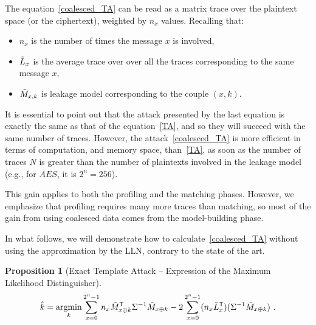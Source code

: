\documentclass[conference,twocolumn]{IEEEtran}
\newtheorem{proposition}{Proposition}
\DeclareMathOperator*\argmin{argmin}
\begin{document}
The equation~\eqref{coalesced_TA} can be read as a matrix trace over the plaintext space (or the ciphertext), weighted by $n_x$ values. 
Recalling that:
\begin{itemize}
\item $n_x$ is the number of times the message $x$ is involved,
\item $\Tilde{L}_x$ is the average trace over over all the traces corresponding to the same message $x$,
\item $\Tilde{M}_{x,k}$ is leakage model corresponding to the couple $(x,k)$. 
\end{itemize}
It is essential to point out that the attack presented by the last equation is exactly the same as that of the equation~\eqref{TA}, and so they will succeed with the same number of traces. 
However, the attack~\eqref{coalesced_TA} is more efficient in terms of computation, and memory space, than~\eqref{TA}, as soon as the number of traces $N$ is greater than the number of plaintexts involved in the leakage model (e.g., for $AES$, it is $2^n = 256$). 

This gain applies to both the profiling and the matching phases. 
However, we emphasize that profiling requires many more traces than matching, so most of the gain from using coalesced data comes from the model-building phase.

In what follows, we will demonstrate how to calculate~\eqref{coalesced_TA} without using the approximation by the LLN, contrary to the state of the art.


\begin{proposition}[Exact Template Attack -- Expression of the Maximum Likelihood Distinguisher]
\label{Exact_Template_Attack}
$$\Hat{k} = \argmin_k \space \sum_{x=0}^{2^n-1} n_x \Tilde{M}^\mathsf{T}_{x \oplus k} \Sigma^{-1}  \Tilde{M}_{x \oplus k} - 2\sum_{x=0}^{2^n-1}(n_x \Tilde{L}^\mathsf{T}_x)(\Sigma^{-1}\Tilde{M}_{x\oplus k}) \ .$$
\end{proposition}
\end{document}
